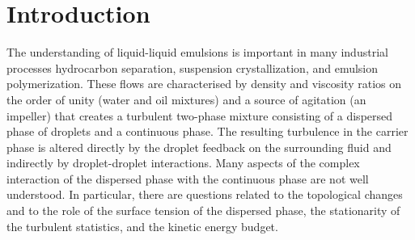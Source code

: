 
\section{Introduction} \label{sec:introduction}
The understanding of liquid-liquid emulsions is important in many industrial processes \eg hydrocarbon separation, suspension crystallization, and emulsion polymerization. These flows are characterised by density and viscosity ratios on the order of unity (\eg water and oil mixtures) and a source of agitation (\eg an impeller) that creates a turbulent two-phase mixture consisting of a dispersed phase of droplets and a continuous phase. The resulting turbulence in the carrier phase is altered directly by the droplet feedback on the surrounding fluid and indirectly by droplet-droplet interactions. Many aspects of the complex interaction of the dispersed phase with the continuous phase are not well understood. In particular, there are questions related to the topological changes and to the role of the surface tension of the dispersed phase, the stationarity of the turbulent statistics, and the kinetic energy budget.

